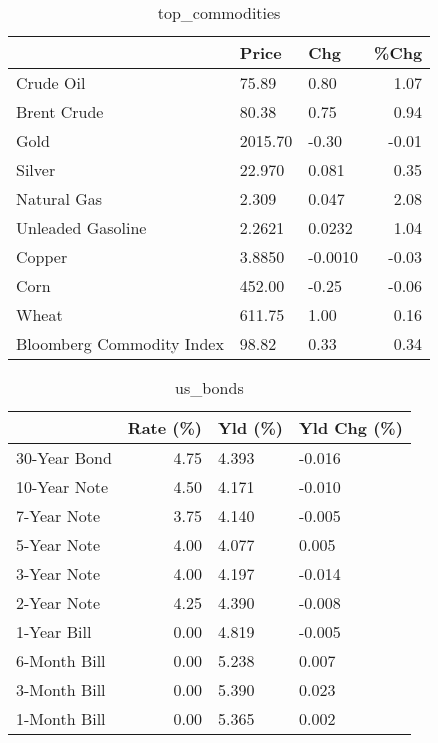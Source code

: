 \documentclass{article}%
\begin{document}
\begin{table}[htbp]%
\caption{top\_commodities}%
\centering%
\begin{adjustbox}{width=1\textwidth}%
\begin{tabular}{lllr}
\toprule
                          &   Price &     Chg &  \%Chg \\
\midrule
               Crude Oil  &   75.89 &    0.80 &  1.07 \\
             Brent Crude  &   80.38 &    0.75 &  0.94 \\
                    Gold  & 2015.70 &   -0.30 & -0.01 \\
                  Silver  &  22.970 &   0.081 &  0.35 \\
             Natural Gas  &   2.309 &   0.047 &  2.08 \\
       Unleaded Gasoline  &  2.2621 &  0.0232 &  1.04 \\
                  Copper  &  3.8850 & -0.0010 & -0.03 \\
                    Corn  &  452.00 &   -0.25 & -0.06 \\
                   Wheat  &  611.75 &    1.00 &  0.16 \\
Bloomberg Commodity Index &   98.82 &    0.33 &  0.34 \\
\bottomrule
\end{tabular}
%
\end{adjustbox}%
\end{table}

%


\begin{table}[htbp]%
\caption{us\_bonds}%
\centering%
\begin{adjustbox}{width=1\textwidth}%
\begin{tabular}{lrll}
\toprule
             &  Rate (\%) & Yld (\%) & Yld Chg (\%) \\
\midrule
30-Year Bond &      4.75 &   4.393 &      -0.016 \\
10-Year Note &      4.50 &   4.171 &      -0.010 \\
 7-Year Note &      3.75 &   4.140 &      -0.005 \\
 5-Year Note &      4.00 &   4.077 &       0.005 \\
 3-Year Note &      4.00 &   4.197 &      -0.014 \\
 2-Year Note &      4.25 &   4.390 &      -0.008 \\
 1-Year Bill &      0.00 &   4.819 &      -0.005 \\
6-Month Bill &      0.00 &   5.238 &       0.007 \\
3-Month Bill &      0.00 &   5.390 &       0.023 \\
1-Month Bill &      0.00 &   5.365 &       0.002 \\
\bottomrule
\end{tabular}
%
\end{adjustbox}%
\end{table}
\end{document}
